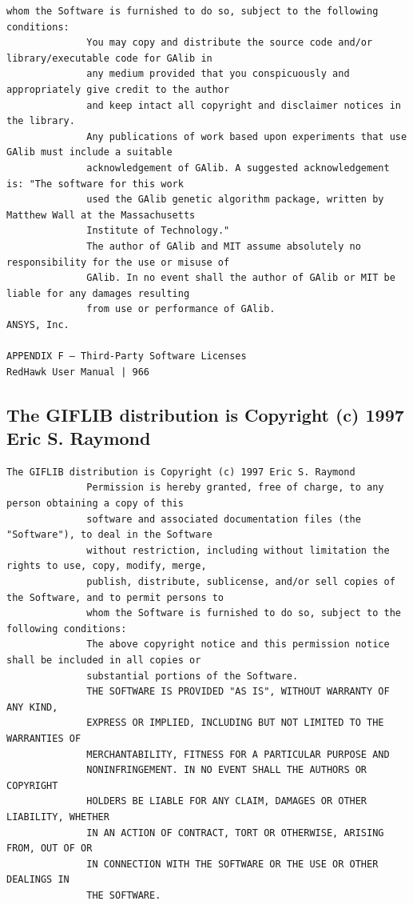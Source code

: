 \begin{lstlisting}[basicstyle=\ttfamily\scriptsize,breaklines=true]
              whom the Software is furnished to do so, subject to the following conditions:
              You may copy and distribute the source code and/or library/executable code for GAlib in
              any medium provided that you conspicuously and appropriately give credit to the author
              and keep intact all copyright and disclaimer notices in the library.
              Any publications of work based upon experiments that use GAlib must include a suitable
              acknowledgement of GAlib. A suggested acknowledgement is: "The software for this work
              used the GAlib genetic algorithm package, written by Matthew Wall at the Massachusetts
              Institute of Technology."
              The author of GAlib and MIT assume absolutely no responsibility for the use or misuse of
              GAlib. In no event shall the author of GAlib or MIT be liable for any damages resulting
              from use or performance of GAlib.
ANSYS, Inc.

APPENDIX F — Third-Party Software Licenses                                     RedHawk User Manual | 966
\end{lstlisting}

\subsection{The GIFLIB distribution is Copyright (c) 1997 Eric S. Raymond}

\begin{lstlisting}[basicstyle=\ttfamily\scriptsize,breaklines=true]
The GIFLIB distribution is Copyright (c) 1997 Eric S. Raymond
              Permission is hereby granted, free of charge, to any person obtaining a copy of this
              software and associated documentation files (the "Software"), to deal in the Software
              without restriction, including without limitation the rights to use, copy, modify, merge,
              publish, distribute, sublicense, and/or sell copies of the Software, and to permit persons to
              whom the Software is furnished to do so, subject to the following conditions:
              The above copyright notice and this permission notice shall be included in all copies or
              substantial portions of the Software.
              THE SOFTWARE IS PROVIDED "AS IS", WITHOUT WARRANTY OF ANY KIND,
              EXPRESS OR IMPLIED, INCLUDING BUT NOT LIMITED TO THE WARRANTIES OF
              MERCHANTABILITY, FITNESS FOR A PARTICULAR PURPOSE AND
              NONINFRINGEMENT. IN NO EVENT SHALL THE AUTHORS OR COPYRIGHT
              HOLDERS BE LIABLE FOR ANY CLAIM, DAMAGES OR OTHER LIABILITY, WHETHER
              IN AN ACTION OF CONTRACT, TORT OR OTHERWISE, ARISING FROM, OUT OF OR
              IN CONNECTION WITH THE SOFTWARE OR THE USE OR OTHER DEALINGS IN
              THE SOFTWARE.
\end{lstlisting}

